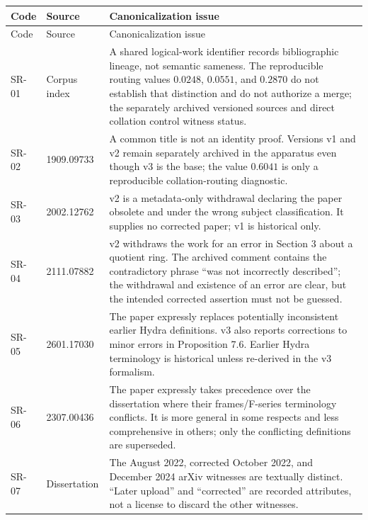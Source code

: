 \begingroup\small
\begin{longtable}{@{}p{}p{}p{}@{}}
\toprule
Code & Source & Canonicalization issue\\
\midrule
\endfirsthead
\toprule
Code & Source & Canonicalization issue\\
\midrule
\endhead
\textsc{SR-01} & Corpus index & A shared logical-work identifier records bibliographic lineage, not semantic sameness.  The reproducible routing values $0.0248$, $0.0551$, and $0.2870$ do not establish that distinction and do not authorize a merge; the separately archived versioned sources and direct collation control witness status.\\

\textsc{SR-02} & 1909.09733 & A common title is not an identity proof.  Versions v1 and v2 remain separately archived in the apparatus even though v3 is the base; the value $0.6041$ is only a reproducible collation-routing diagnostic.\\

\textsc{SR-03} & 2002.12762 & v2 is a metadata-only withdrawal declaring the paper obsolete and under the wrong subject classification.  It supplies no corrected paper; v1 is historical only.\\

\textsc{SR-04} & 2111.07882 & v2 withdraws the work for an error in Section 3 about a quotient ring.  The archived comment contains the contradictory phrase ``was not incorrectly described''; the withdrawal and existence of an error are clear, but the intended corrected assertion must not be guessed.\\

\textsc{SR-05} & 2601.17030 & The paper expressly replaces potentially inconsistent earlier Hydra definitions.  v3 also reports corrections to minor errors in Proposition 7.6.  Earlier Hydra terminology is historical unless re-derived in the v3 formalism.\\

\textsc{SR-06} & 2307.00436 & The paper expressly takes precedence over the dissertation where their frames/F-series terminology conflicts.  It is more general in some respects and less comprehensive in others; only the conflicting definitions are superseded.\\

\textsc{SR-07} & Dissertation & The August 2022, corrected October 2022, and December 2024 arXiv witnesses are textually distinct.  ``Later upload'' and ``corrected'' are recorded attributes, not a license to discard the other witnesses.\\


\end{longtable}

